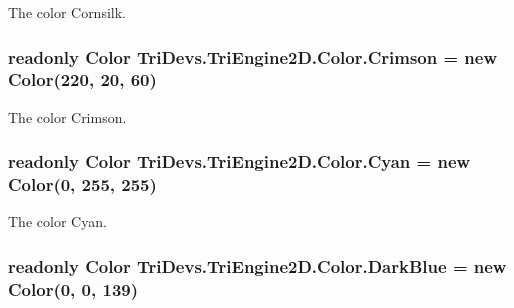 The color Cornsilk. 

\hypertarget{struct_tri_devs_1_1_tri_engine2_d_1_1_color_acb466803105e8843e6fb17c830b5ad33}{
\subsubsection[{Crimson}]{\setlength{\rightskip}{0pt plus 5cm}readonly {\bf Color} Tri\-Devs.\-Tri\-Engine2\-D.\-Color.\-Crimson = new {\bf Color}(220, 20, 60)\hspace{0.3cm}{\ttfamily [static]}}}\label{struct_tri_devs_1_1_tri_engine2_d_1_1_color_acb466803105e8843e6fb17c830b5ad33}


The color Crimson. 

\hypertarget{struct_tri_devs_1_1_tri_engine2_d_1_1_color_a687b24f1301993ac3e3a2ada68ef52d0}{
\subsubsection[{Cyan}]{\setlength{\rightskip}{0pt plus 5cm}readonly {\bf Color} Tri\-Devs.\-Tri\-Engine2\-D.\-Color.\-Cyan = new {\bf Color}(0, 255, 255)\hspace{0.3cm}{\ttfamily [static]}}}\label{struct_tri_devs_1_1_tri_engine2_d_1_1_color_a687b24f1301993ac3e3a2ada68ef52d0}


The color Cyan. 

\hypertarget{struct_tri_devs_1_1_tri_engine2_d_1_1_color_af347b38273428c1441418a59a7eda9c7}{
\subsubsection[{Dark\-Blue}]{\setlength{\rightskip}{0pt plus 5cm}readonly {\bf Color} Tri\-Devs.\-Tri\-Engine2\-D.\-Color.\-Dark\-Blue = new {\bf Color}(0, 0, 139)\hspace{0.3cm}{\ttfamily [static]}}}\label{struct_tri_devs_1_1_tri_engine2_d_1_1_color_af347b38273428c1441418a59a7eda9c7}


